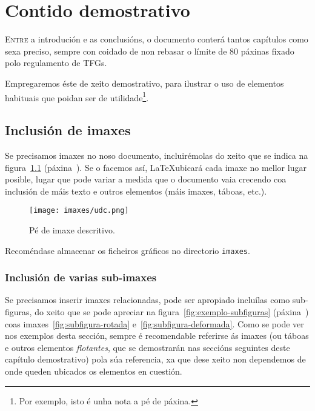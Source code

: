 %

\chapter{Contido demostrativo}
\label{chap:demo}

\lettrine{E}{ntre} a introdución e as conclusións, o documento conterá
tantos capítulos como sexa preciso, sempre con coidado de non rebasar
o límite de 80 páxinas fixado polo regulamento de TFGs.

Empregaremos éste de xeito demostrativo, para ilustrar o uso de
elementos habituais que poidan ser de utilidade\footnote{Por exemplo,
  isto é unha nota a pé de páxina.}.

\section{Inclusión de imaxes}

Se precisamos imaxes no noso documento, incluirémolas do xeito que se
indica na figura~\ref{fig:exemplo} (páxina~\pageref{fig:exemplo}). Se
o facemos así, \LaTeX ubicará cada imaxe no mellor lugar posible,
lugar que pode variar a medida que o documento vaia crecendo coa
inclusión de máis texto e outros elementos (máis imaxes, táboas,
etc.).

\begin{figure}[hp!]
  \centering
  \texttt{[image: imaxes/udc.png]}
  \caption{Pé de imaxe descritivo.}
  \label{fig:exemplo}
\end{figure}

Recoméndase almacenar os ficheiros gráficos no directorio
\texttt{imaxes}.

\subsection{Inclusión de varias sub-imaxes}

Se precisamos inserir imaxes relacionadas, pode ser apropiado
incluílas como sub-figuras, do xeito que se pode apreciar na
figura~\ref{fig:exemplo-subfiguras} (páxina~\pageref{fig:exemplo-subfiguras})
coas imaxes~\ref{fig:subfigura-rotada} e~\ref{fig:subfigura-deformada}.
Como se pode ver nos exemplos desta sección, sempre é recomendable
referirse ás imaxes (ou táboas e outros elementos \emph{flotantes},
que se demostrarán nas seccións seguintes deste capítulo demostrativo)
pola súa referencia, xa que dese xeito non dependemos de onde
queden ubicados os elementos en cuestión.

